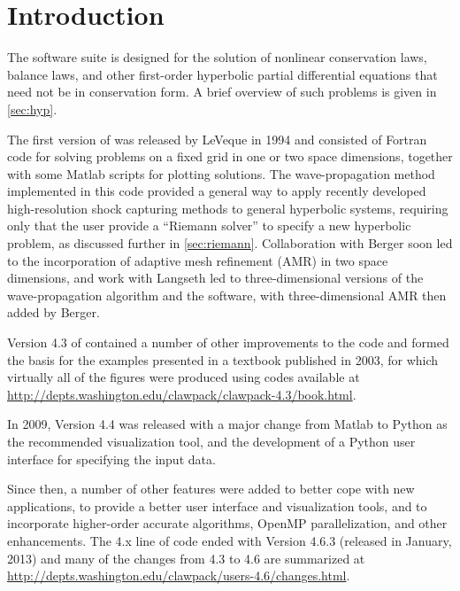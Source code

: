 %
%
%

\section{Introduction}\label{sec:intro}

The \clawpack software suite \cite{clawpack}
is designed for the solution of nonlinear conservation laws, balance laws,
and other first-order hyperbolic partial differential
equations that need not be in conservation form. 
A brief overview of such problems is given in \cref{sec:hyp}.

The first version of \clawpack was released by LeVeque in 1994 
\cite{clawpack-v1} and consisted of Fortran code for solving problems on a
fixed grid in one or two space dimensions, together with some Matlab scripts
for plotting solutions. The wave-propagation method implemented
in this code provided a general way to apply recently developed
high-resolution shock capturing methods to general hyperbolic systems,
requiring only that the user provide a ``Riemann solver'' to specify a new
hyperbolic problem, as discussed further in \cref{sec:riemann}.  
Collaboration with Berger \cite{mjb-rjl:amrclaw} 
soon led to the incorporation of adaptive mesh refinement (AMR) in two space
dimensions, and work with Langseth \cite{jol-rjl:3d, jol:thesis}
led to three-dimensional versions of the wave-propagation algorithm and the
software, with three-dimensional AMR then added by Berger.

Version 4.3 of \clawpack contained a number of other improvements to the code
and formed the basis for the examples presented in a textbook \cite{rjl:fvmhp}
published in 2003, for which virtually all of the figures were
produced using codes available at
\url{http://depts.washington.edu/clawpack/clawpack-4.3/book.html}.

In 2009, Version 4.4 was released with a major change from Matlab
to Python as the recommended visualization tool, and the development
of a Python user interface for specifying the input data.

Since then, a number of other features were added to better cope with new
applications, to provide a better user interface and visualization tools, and to
incorporate higher-order accurate algorithms, OpenMP parallelization, and
other enhancements. The \clawpack 4.x line of code ended with Version 4.6.3
(released in January, 2013) and
many of the changes from 4.3 to 4.6 are summarized at
\url{http://depts.washington.edu/clawpack/users-4.6/changes.html}.

